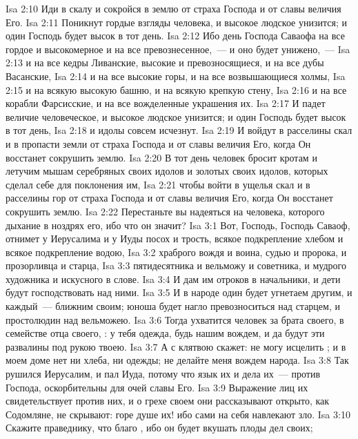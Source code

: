 \vs Isa 2:10 Иди в скалу и сокройся в землю от страха Господа и от славы величия Его.
\vs Isa 2:11 Поникнут гордые взгляды человека, и высокое людское унизится; и один Господь будет высок в тот день.
\vs Isa 2:12 Ибо  день Господа Саваофа на все гордое и высокомерное и на все превознесенное,~--- и оно будет унижено,~---
\vs Isa 2:13 и на все кедры Ливанские, высокие и превозносящиеся, и на все дубы Васанские,
\vs Isa 2:14 и на все высокие горы, и на все возвышающиеся холмы,
\vs Isa 2:15 и на всякую высокую башню, и на всякую крепкую стену,
\vs Isa 2:16 и на все корабли Фарсисские, и на все вожделенные украшения их.
\vs Isa 2:17 И падет величие человеческое, и высокое людское унизится; и один Господь будет высок в тот день,
\vs Isa 2:18 и идолы совсем исчезнут.
\vs Isa 2:19 И войдут  в расселины скал и в пропасти земли от страха Господа и от славы величия Его, когда Он восстанет сокрушить землю.
\vs Isa 2:20 В тот день человек бросит кротам и летучим мышам серебряных своих идолов и золотых своих идолов, которых сделал себе для поклонения им,
\vs Isa 2:21 чтобы войти в ущелья скал и в расселины гор от страха Господа и от славы величия Его, когда Он восстанет сокрушить землю.
\vs Isa 2:22 Перестаньте вы надеяться на человека, которого дыхание в ноздрях его, ибо что он значит?
\vs Isa 3:1 Вот, Господь, Господь Саваоф, отнимет у Иерусалима и у Иуды посох и трость, всякое подкрепление хлебом и всякое подкрепление водою,
\vs Isa 3:2 храброго вождя и воина, судью и пророка, и прозорливца и старца,
\vs Isa 3:3 пятидесятника и вельможу и советника, и мудрого художника и искусного в слове.
\vs Isa 3:4 И дам им отроков в начальники, и дети будут господствовать над ними.
\vs Isa 3:5 И в народе один будет угнетаем другим, и каждый~--- ближним своим; юноша будет нагло превозноситься над старцем, и простолюдин над вельможею.
\vs Isa 3:6 Тогда ухватится человек за брата своего, в семействе отца своего, : у тебя  одежда, будь нашим вождем, и да будут эти развалины под рукою твоею.
\vs Isa 3:7 А  с клятвою скажет: не могу исцелить ; и в моем доме нет ни хлеба, ни одежды; не делайте меня вождем народа.
\vs Isa 3:8 Так рушился Иерусалим, и пал Иуда, потому что язык их и дела их~--- против Господа, оскорбительны для очей славы Его.
\vs Isa 3:9 Выражение лиц их свидетельствует против них, и о грехе своем они рассказывают открыто, как Содомляне, не скрывают: горе душе их! ибо сами на себя навлекают зло.
\vs Isa 3:10 Скажите праведнику, что благо , ибо он будет вкушать плоды дел своих;
